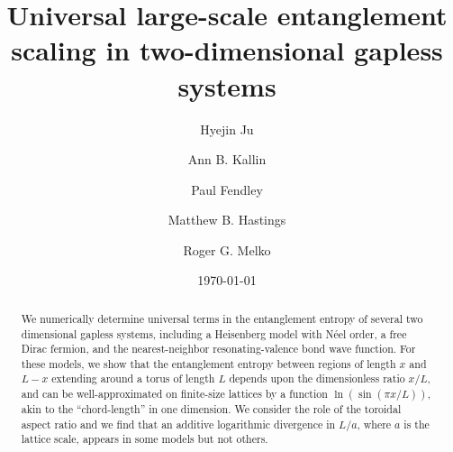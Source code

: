 \documentclass[prl,aps,twocolumn,floatfix,amsmath,amssymb,superscriptaddress,tightenlines]{revtex4}
\begin{document}
\newcommand{\be}{\begin{equation}}
\newcommand{\ee}{\end{equation}}

\date{\today}
\title{Universal large-scale entanglement scaling in
  two-dimensional gapless systems}

\author{Hyejin Ju}

\author{Ann B. Kallin}

\author{Paul Fendley}

\author{Matthew B. Hastings}

\author{Roger G. Melko}

\begin{abstract} 
We numerically determine universal terms in the entanglement entropy of several two dimensional gapless systems, including a Heisenberg model with N\'eel order, a free Dirac fermion, and the nearest-neighbor resonating-valence bond wave function.
For these models, we show that the entanglement entropy between regions of length $x$ and $L-x$ extending around a torus of
length $L$ depends upon the dimensionless ratio $x/L$, and can be well-approximated on finite-size lattices by a function
$\ln(\sin(\pi x/L))$, akin to the ``chord-length'' in one dimension.
We consider the role of the toroidal aspect ratio and we find that an additive logarithmic divergence in $L/a$, where $a$ is the lattice scale, appears in some models but not others.
\end{abstract}
\maketitle
\end{document}
